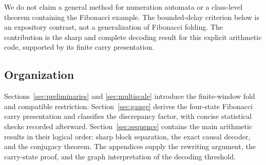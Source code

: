 We do not claim a general method for numeration automata or a class-level theorem containing the Fibonacci example. The bounded-delay criterion below is an expository contrast, not a generalization of Fibonacci folding. The contribution is the sharp and complete decoding result for this explicit arithmetic code, supported by its finite carry presentation.

\subsection{Organization}

Sections~\ref{sec:preliminaries} and \ref{sec:multiscale} introduce the finite-window fold and compatible restriction. Section~\ref{sec:gauge} derives the four-state Fibonacci carry presentation and classifies the discrepancy factor, with concise statistical checks recorded afterward. Section~\ref{sec:sequence} contains the main arithmetic results in their logical order: sharp block separation, the exact causal decoder, and the conjugacy theorem. The appendices supply the rewriting argument, the carry-state proof, and the graph interpretation of the decoding threshold.
